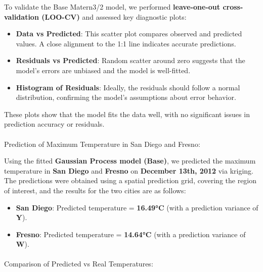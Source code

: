 \documentclass[
  11pt,
]{article}
\makeatletter
\let\oldparagraph\paragraph
\renewcommand{\paragraph}{
    \@ifstar
      \xxxParagraphStar
      \xxxParagraphNoStar
  }
\newcommand{\xxxParagraphStar}[1]{\oldparagraph*{#1}\mbox{}}
\newcommand{\xxxParagraphNoStar}[1]{\oldparagraph{#1}\mbox{}}
\makeatother
\begin{document}
To validate the Base Matern3/2 model, we performed \textbf{leave-one-out
cross-validation (LOO-CV)} and assessed key diagnostic plots:

\begin{itemize}
\item
  \textbf{Data vs Predicted}: This scatter plot compares observed and
  predicted values. A close alignment to the 1:1 line indicates accurate
  predictions.
\item
  \textbf{Residuals vs Predicted}: Random scatter around zero suggests
  that the model's errors are unbiased and the model is well-fitted.
\item
  \textbf{Histogram of Residuals}: Ideally, the residuals should follow
  a normal distribution, confirming the model's assumptions about error
  behavior.
\end{itemize}

These plots show that the model fits the data well, with no significant
issues in prediction accuracy or residuals.

\paragraph{Prediction of Maximum Temperature in San Diego and
Fresno:}\label{prediction-of-maximum-temperature-in-san-diego-and-fresno}

Using the fitted \textbf{Gaussian Process model (Base)}, we predicted
the maximum temperature in \textbf{San Diego} and \textbf{Fresno} on
\textbf{December 13th, 2012} via kriging. The predictions were obtained
using a spatial prediction grid, covering the region of interest, and
the results for the two cities are as follows:

\begin{itemize}
\item
  \textbf{San Diego}: Predicted temperature = \textbf{16.49°C} (with a
  prediction variance of \textbf{Y}).
\item
  \textbf{Fresno}: Predicted temperature = \textbf{14.64°C} (with a
  prediction variance of \textbf{W}).
\end{itemize}

\paragraph{Comparison of Predicted vs Real
Temperatures:}\label{comparison-of-predicted-vs-real-temperatures}
\end{document}
